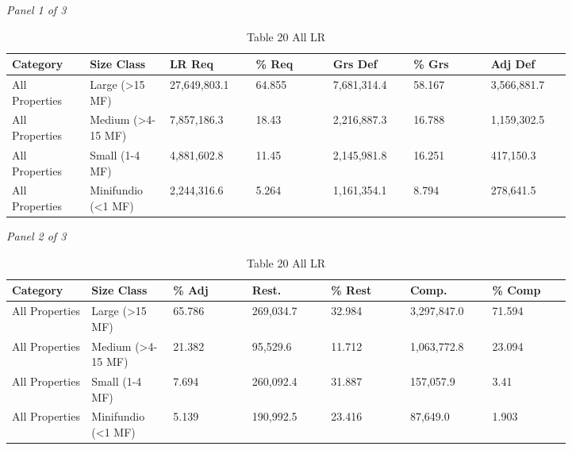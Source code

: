 \documentclass[12pt]{article}
\begin{document}
\begin{landscape}
\begin{table}[H]
\centering
\caption{Table 20 All LR}
\textit{Panel 1 of 3}\\[2pt]
{\fontsize{12}{14}\selectfont
\setlength{\tabcolsep}{3pt}
\renewcommand{\arraystretch}{1.08}
\begin{tabular}{p{0.117\linewidth}p{0.117\linewidth}p{0.117\linewidth}p{0.117\linewidth}p{0.117\linewidth}p{0.117\linewidth}p{0.117\linewidth}}
\toprule
Category & Size Class & LR Req & \% Req & Grs Def & \% Grs & Adj Def \\
\midrule
All Properties & Large (>15 MF) & 27,649,803.1 & 64.855 & 7,681,314.4 & 58.167 & 3,566,881.7 \\
All Properties & Medium (>4-15 MF) & 7,857,186.3 & 18.43 & 2,216,887.3 & 16.788 & 1,159,302.5 \\
All Properties & Small (1-4 MF) & 4,881,602.8 & 11.45 & 2,145,981.8 & 16.251 & 417,150.3 \\
All Properties & Minifundio (<1 MF) & 2,244,316.6 & 5.264 & 1,161,354.1 & 8.794 & 278,641.5 \\
\bottomrule
\end{tabular}
}

\vspace{0.6em}

\textit{Panel 2 of 3}\\[2pt]
{\fontsize{12}{14}\selectfont
\setlength{\tabcolsep}{3pt}
\renewcommand{\arraystretch}{1.08}
\begin{tabular}{p{0.117\linewidth}p{0.117\linewidth}p{0.117\linewidth}p{0.117\linewidth}p{0.117\linewidth}p{0.117\linewidth}p{0.117\linewidth}}
\toprule
Category & Size Class & \% Adj & Rest. & \% Rest & Comp. & \% Comp \\
\midrule
All Properties & Large (>15 MF) & 65.786 & 269,034.7 & 32.984 & 3,297,847.0 & 71.594 \\
All Properties & Medium (>4-15 MF) & 21.382 & 95,529.6 & 11.712 & 1,063,772.8 & 23.094 \\
All Properties & Small (1-4 MF) & 7.694 & 260,092.4 & 31.887 & 157,057.9 & 3.41 \\
All Properties & Minifundio (<1 MF) & 5.139 & 190,992.5 & 23.416 & 87,649.0 & 1.903 \\
\bottomrule
\end{tabular}
}

\vspace{0.6em}


\end{table}
\end{landscape}
\end{document}
